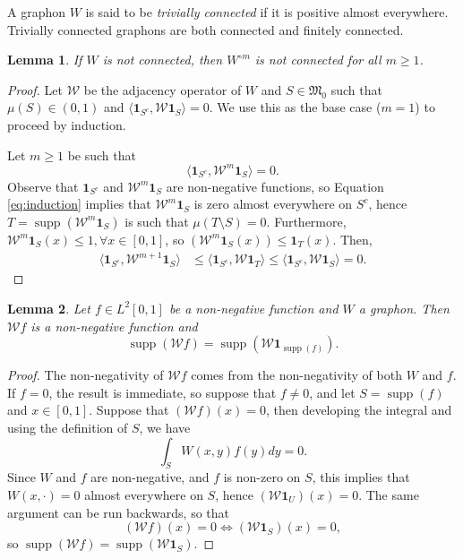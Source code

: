 \documentclass[11pt]{article}
\def\supp{\operatorname{supp}}
\def\II{\bm{1}}
\def\calW{\mathcal{W}}
\def\frakM{\mathfrak{M}_0}
\newtheorem{lemma}{Lemma}[section]
\theoremstyle{definition}
\begin{document}
A graphon $W$ is said to be \textit{trivially connected} if it is positive almost everywhere. Trivially connected graphons are both connected and finitely connected. 

\begin{lemma} \label{lemma:not-connected}
    If $W$ is not connected, then $W^{\circ m}$ is not connected for all $m \ge 1$.
\end{lemma}
\begin{proof}
    Let $\calW$ be the adjacency operator of $W$ and $S \in \frakM$ such that $\mu(S) \in (0,1)$ and $\langle \II_{S^c}, \calW \II_S \rangle = 0$. We use this as the base case ($m=1$) to proceed by induction.

    Let $m \ge 1$ be such that 
    \begin{equation} \label{eq:induction}
    \langle \II_{S^c}, \calW^m \II_S \rangle = 0.
    \end{equation}
    Observe that $\II_{S^c}$ and $\calW^m \II_S$ are non-negative functions, so Equation \eqref{eq:induction} implies that $\calW^m \II_S$ is zero almost everywhere on $S^c$, hence $T = \supp (\calW^m \II_S)$ is such that $ \mu(T \setminus S)=0$. Furthermore, $\calW^m \II_S (x) \le 1, \forall x \in [0,1]$, so $(\calW^m \II_S (x)) \le \II_T (x)$. Then,
    \begin{align*}
        \langle \II_{S^c}, \calW^{m+1} \II_S \rangle &\le \langle \II_{S^c}, \calW \II_T \rangle \le \langle \II_{S^c}, \calW \II_{S} \rangle =0. 
    \end{align*}
\end{proof}

\begin{lemma} \label{lemma:neighborhood}
    Let $f \in L^2[0,1]$ be a non-negative function and $W$ a graphon. Then $\calW f$ is a non-negative function and
    $$ \supp (\calW f) = \supp (\calW \II_{\supp(f)}). $$
\end{lemma}
\begin{proof}
    The non-negativity of $\calW f$ comes from the non-negativity of both $W$ and $f$. If $f=0$, the result is immediate, so suppose that $f\neq 0$, and let $S = \supp (f)$ and $x\in [0,1]$. Suppose that $(\calW f)(x) = 0$, then developing the integral and using the definition of $S$, we have
    $$ \int_S W(x,y) f(y) dy = 0. $$
    Since $W$ and $f$ are non-negative, and $f$ is non-zero on $S$, this implies that $W(x,\cdot) = 0$ almost everywhere on $S$, hence $(\calW \II_U)(x) = 0$. The same argument can be run backwards, so that
    $$ (\calW f)(x) = 0 \Leftrightarrow (\calW \II_S)(x) = 0, $$
    so $\supp (\calW f) = \supp (\calW \II_S)$.
\end{proof}
\end{document}
